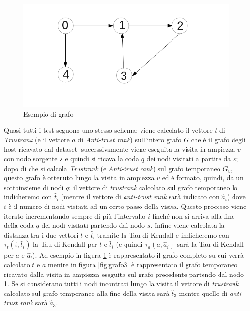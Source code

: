 \begin{figure}
\centering
 \includegraphics{immagini/test/grafoComp}
 \caption{Esempio di grafo}
 \label{fig:grafoComp}
\end{figure}

Quasi tutti i test seguono uno stesso schema; viene calcolato il vettore \(t\) di  \textit{Trustrank} (e il vettore \(a\) di \textit{Anti-trust rank}) sull'intero grafo \(G\) che è il grafo degli host ricavato dal dataset; successivamente viene eseguita la visita in ampiezza \(v\) con nodo sorgente \(s\) e quindi si ricava la coda \(q\) dei nodi visitati a partire da \(s\); dopo di che si calcola  \textit{Trustrank} (e \textit{Anti-trust rank}) sul grafo temporaneo \(G_v\), questo grafo è ottenuto lungo la visita in ampiezza \(v\) ed è formato, quindi, da un sottoinsieme di nodi \(q\); il vettore di \textit{trustrank} calcolato sul grafo temporaneo lo indicheremo con \(\hat{t}_i\) (mentre il vettore di \textit{anti-trust rank} sarà indicato con \(\hat{a}_i\)) dove \(i\) è il numero di nodi visitati ad un certo passo della visita. Questo processo viene iterato incrementando sempre di più l'intervallo \(i\) finché non si arriva alla fine della coda \(q\) dei nodi visitati partendo dal nodo \(s\). Infine viene calcolata la distanza tra i due vettori \(t\) e \(\hat{t}_i\) tramite la Tau di Kendall e indicheremo con \(\tau_t(t,\hat{t}_i)\) la Tau di Kendall per \(t\) e \(\hat{t}_i\)  (e quindi \(\tau_a(a,\hat{a}_i)\) sarà la Tau di Kendall per \(a\) e \(\hat{a}_i\)). Ad esempio in figura \ref{fig:grafoComp} è rappresentato il grafo completo su cui verrà calcolato \(t\) e \(a\) mentre in figura \ref{fig:grafo3} è rappresentato il grafo temporaneo ricavato dalla visita in ampiezza eseguita sul grafo precedente partendo dal nodo 1. Se si considerano tutti i nodi incontrati lungo la visita il vettore di \textit{trustrank} calcolato sul grafo temporaneo alla fine della visita sarà \(\hat{t}_3\) mentre quello di \textit{anti-trust rank} sarà \(\hat{a}_3\).

